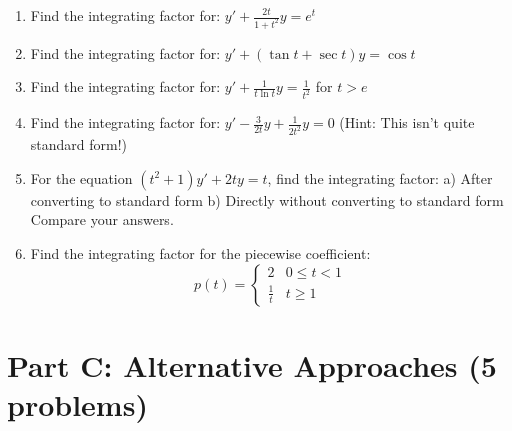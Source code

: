 \documentclass[12pt]{article}
\begin{document}
\begin{enumerate}[resume]
\item Find the integrating factor for: $y' + \frac{2t}{1+t^2}y = e^t$

\item Find the integrating factor for: $y' + (\tan t + \sec t)y = \cos t$

\item Find the integrating factor for: $y' + \frac{1}{t\ln t}y = \frac{1}{t^2}$ for $t > e$

\item Find the integrating factor for: $y' - \frac{3}{2t}y + \frac{1}{2t^2}y = 0$ (Hint: This isn't quite standard form!)

\item For the equation $(t^2 + 1)y' + 2ty = t$, find the integrating factor:
   a) After converting to standard form
   b) Directly without converting to standard form
   Compare your answers.

\item Find the integrating factor for the piecewise coefficient:
\begin{equation}
p(t) = \begin{cases}
2 & 0 \leq t < 1 \\
\frac{1}{t} & t \geq 1
\end{cases}
\end{equation}
\end{enumerate}

\section*{Part C: Alternative Approaches (5 problems)}
\end{document}
